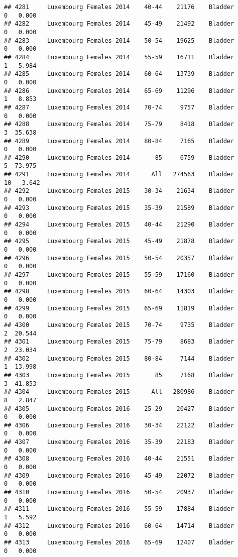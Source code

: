 \documentclass[
]{article}
\begin{document}
\begin{verbatim}
## 4281     Luxembourg Females 2014    40-44    21176    Bladder      0   0.000
## 4282     Luxembourg Females 2014    45-49    21492    Bladder      0   0.000
## 4283     Luxembourg Females 2014    50-54    19625    Bladder      0   0.000
## 4284     Luxembourg Females 2014    55-59    16711    Bladder      1   5.984
## 4285     Luxembourg Females 2014    60-64    13739    Bladder      0   0.000
## 4286     Luxembourg Females 2014    65-69    11296    Bladder      1   8.853
## 4287     Luxembourg Females 2014    70-74     9757    Bladder      0   0.000
## 4288     Luxembourg Females 2014    75-79     8418    Bladder      3  35.638
## 4289     Luxembourg Females 2014    80-84     7165    Bladder      0   0.000
## 4290     Luxembourg Females 2014       85     6759    Bladder      5  73.975
## 4291     Luxembourg Females 2014      All   274563    Bladder     10   3.642
## 4292     Luxembourg Females 2015    30-34    21634    Bladder      0   0.000
## 4293     Luxembourg Females 2015    35-39    21589    Bladder      0   0.000
## 4294     Luxembourg Females 2015    40-44    21290    Bladder      0   0.000
## 4295     Luxembourg Females 2015    45-49    21878    Bladder      0   0.000
## 4296     Luxembourg Females 2015    50-54    20357    Bladder      0   0.000
## 4297     Luxembourg Females 2015    55-59    17160    Bladder      0   0.000
## 4298     Luxembourg Females 2015    60-64    14303    Bladder      0   0.000
## 4299     Luxembourg Females 2015    65-69    11819    Bladder      0   0.000
## 4300     Luxembourg Females 2015    70-74     9735    Bladder      2  20.544
## 4301     Luxembourg Females 2015    75-79     8683    Bladder      2  23.034
## 4302     Luxembourg Females 2015    80-84     7144    Bladder      1  13.998
## 4303     Luxembourg Females 2015       85     7168    Bladder      3  41.853
## 4304     Luxembourg Females 2015      All   280986    Bladder      8   2.847
## 4305     Luxembourg Females 2016    25-29    20427    Bladder      0   0.000
## 4306     Luxembourg Females 2016    30-34    22122    Bladder      0   0.000
## 4307     Luxembourg Females 2016    35-39    22183    Bladder      0   0.000
## 4308     Luxembourg Females 2016    40-44    21551    Bladder      0   0.000
## 4309     Luxembourg Females 2016    45-49    22072    Bladder      0   0.000
## 4310     Luxembourg Females 2016    50-54    20937    Bladder      0   0.000
## 4311     Luxembourg Females 2016    55-59    17884    Bladder      1   5.592
## 4312     Luxembourg Females 2016    60-64    14714    Bladder      0   0.000
## 4313     Luxembourg Females 2016    65-69    12407    Bladder      0   0.000

\end{verbatim}
\end{document}
